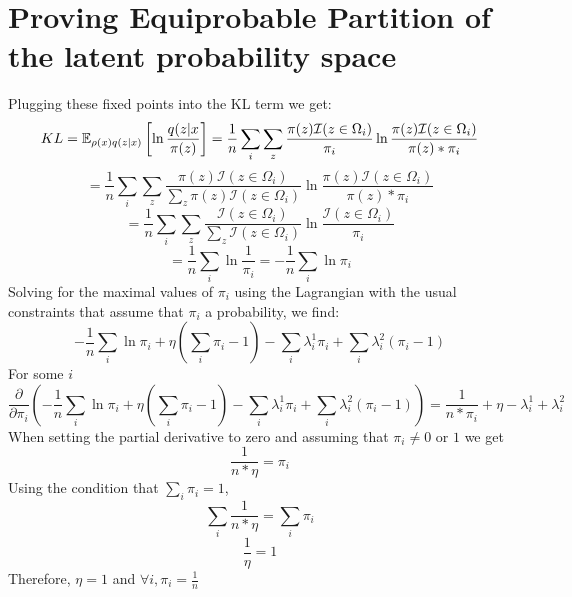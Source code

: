 \section*{Proving Equiprobable Partition of the latent probability space}
Plugging these fixed points into the KL term we get:
\setcounter{equation}{0}
\begin{equation}
KL = \operatorname{\mathbb{E}}_{\rho(x)q(z|x)}\left[\ln{\frac{q(z|x}{\pi(z)}}\right] = \frac{1}{n} \sum_i \sum_z \frac{\pi(z)\mathcal{I}({z\in\Omega_{i}})}{\pi_{i}}\ln{\frac{\pi(z)\mathcal{I}(z\in\Omega_i)}{\pi(z)*\pi_i}}
\end{equation}
\begin{equation}
= \frac{1}{n} \sum_i \sum_z \frac{\pi(z)\mathcal{I}({z\in\Omega_{i}})}{\sum_z \pi(z)\mathcal{I}(z\in\Omega_i)}\ln{\frac{\pi(z)\mathcal{I}(z\in\Omega_i)}{\pi(z)*\pi_i}}
\end{equation}
\begin{equation}
= \frac{1}{n} \sum_i \sum_z \frac{\mathcal{I}({z\in\Omega_{i}})}{\sum_z \mathcal{I}(z\in\Omega_i)}\ln{\frac{\mathcal{I}(z\in\Omega_i)}{\pi_i}}
\end{equation}
\begin{equation}
= \frac{1}{n} \sum_i \ln{\frac{1}{\pi_i}} = -\frac{1}{n} \sum_i \ln{\pi_i}
\end{equation}
Solving for the maximal values of $\pi_i$ using the Lagrangian with the usual constraints that assume that $\pi_i$ a probability, we find:
\begin{equation}
-\frac{1}{n}\sum_i\ln{\pi_i} +\eta(\sum_i\pi_i-1)-\sum_i\lambda_i^1\pi_i +\sum_i\lambda_i^2(\pi_i-1)
\end{equation}
For some $i$
\begin{equation}
\frac{\partial}{\partial \pi_i}\left(-\frac{1}{n}\sum_i\ln{\pi_i} +\eta(\sum_i\pi_i-1)-\sum_i\lambda_i^1\pi_i +\sum_i\lambda_i^2(\pi_i-1)\right)= \frac{1}{n*\pi_i} + \eta - \lambda_i^1 + \lambda_i^2
\end{equation}
When setting the partial derivative to zero and assuming that $\pi_i \neq 0$ or $1$ we get
\begin{equation}
\frac{1}{n*\eta} = \pi_i
\end{equation}
Using the condition that $\sum_i\pi_i=1$,
\begin{equation}
\sum_i\frac{1}{n*\eta} = \sum_i\pi_i
\end{equation}
\begin{equation}
\frac{1}{\eta} = 1
\end{equation}
Therefore, $\eta = 1$ and $\forall i, \pi_i = \frac{1}{n}$

